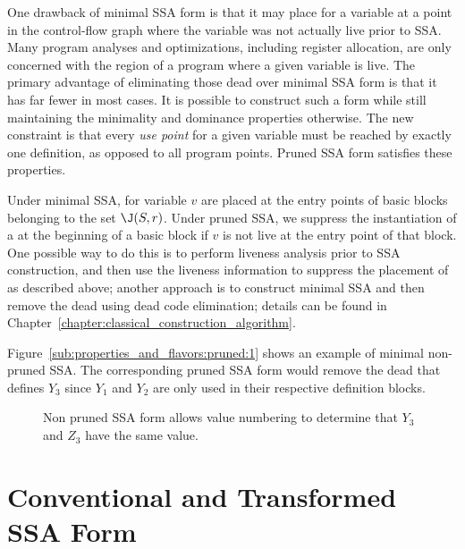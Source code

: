 One drawback of minimal SSA form is that it may place \phifuns for a variable at a point in the control-flow graph where the variable was not actually live prior to SSA. 
Many program analyses and optimizations, including register allocation, are only concerned with the region of a program where a given variable is live. 
The primary advantage of eliminating those dead \phifuns over minimal SSA form is that it has far fewer \phifuns in most cases. 
It is possible to construct such a form while still maintaining the minimality and dominance properties otherwise. 
The new constraint is that every \emph{use point} for a given variable must be reached by exactly one definition, as opposed to all program points. 
Pruned SSA form satisfies these properties.

Under minimal SSA, \phifuns for variable $v$ are placed at the entry points of basic blocks belonging to the set $\J(S,r)$. 
Under pruned SSA, we suppress the instantiation of a \phifun at the beginning of a basic block if $v$ is not live at the entry point of that block. 
One possible way to do this is to perform liveness analysis prior to SSA construction, and then use the liveness information to suppress the placement of \phifuns as described above; 
another approach is to construct minimal SSA and then remove the dead \phifuns using dead code elimination; 
details can be found in Chapter~\ref{chapter:classical_construction_algorithm}.

Figure~\ref{sub:properties_and_flavors:pruned:1} shows an example of minimal non-pruned SSA. 
The corresponding pruned SSA form would remove the dead \phifun that defines $Y_3$ since $Y_1$ and $Y_2$ are only used in their respective definition blocks.

\begin{figure}
\begin{center}
\caption{Non pruned SSA form allows value numbering to determine that $Y_3$ and $Z_3$ have the same value.}
\label{fig:properties_and_flavors:pruned}
\end{center}
\end{figure}




\section{Conventional and Transformed SSA Form}
\label{sec-prop-conventional}

